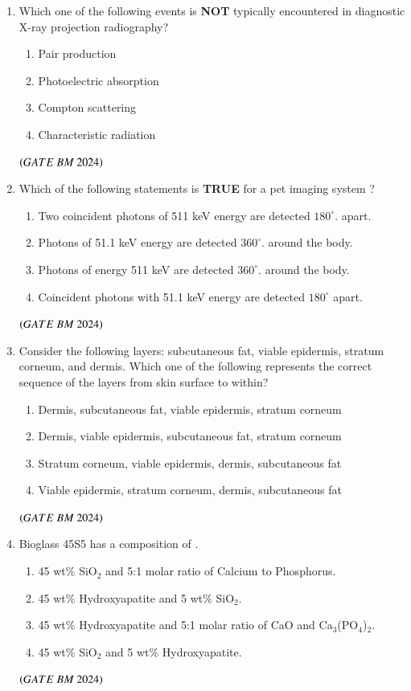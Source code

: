 \documentclass[journal,12pt,onecolumn]{IEEEtran}
\theoremstyle{remark}
\begin{document}
\begin{enumerate}
\item Which one of the following events is \textbf{NOT} typically encountered in diagnostic
X-ray projection radiography?
\begin{enumerate}[label=(\Alph*)]
\item Pair production
\item Photoelectric absorption
\item Compton scattering
\item Characteristic radiation
\end{enumerate}
\hfill $\brak{GATE\ BM\ 2024}$

\item Which of the following statements is \textbf{TRUE} for a pet imaging system ?
\begin{enumerate}[label=(\Alph*)]
\item Two coincident photons of 511 keV energy are detected $180^\circ$. apart.
\item Photons of 51.1 keV energy are detected $360^\circ$. around the body.
\item Photons of energy 511 keV are detected $360^\circ$. around the body.
\item Coincident photons with 51.1 keV energy are detected $180^\circ$ apart.
\end{enumerate}
\hfill $\brak{GATE\ BM\ 2024}$

\item Consider the following layers: subcutaneous fat, viable epidermis, stratum
corneum, and dermis. Which one of the following represents the correct sequence
of the layers from skin surface to within? 
\begin{enumerate}[label=(\Alph*)]
\item Dermis, subcutaneous fat, viable epidermis, stratum corneum
\item Dermis, viable epidermis, subcutaneous fat, stratum corneum
\item Stratum corneum, viable epidermis, dermis, subcutaneous fat
\item Viable epidermis, stratum corneum, dermis, subcutaneous fat
\end{enumerate}
\hfill $\brak{GATE\ BM\ 2024}$

\item Bioglass 45S5 has a composition of \underline{\hspace{2cm}}. 
\begin{enumerate}[label=(\Alph*)]
\item 45 wt\% SiO$_2$ and 5:1 molar ratio of Calcium to Phosphorus. 
\item 45 wt\% Hydroxyapatite and 5 wt\% SiO$_2$.
\item 45 wt\% Hydroxyapatite and 5:1 molar ratio of CaO and Ca$_3$(PO$_4$)$_2$.
\item 45 wt\% SiO$_2$ and 5 wt\% Hydroxyapatite.
\end{enumerate}
\hfill $\brak{GATE\ BM\ 2024}$


\end{enumerate}
\end{document}
